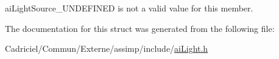 ai\-Light\-Source\-\_\-\-U\-N\-D\-E\-F\-I\-N\-E\-D is not a valid value for this member. 

The documentation for this struct was generated from the following file\-:\begin{DoxyCompactItemize}
\item 
Cadriciel/\-Commun/\-Externe/assimp/include/\hyperlink{ai_light_8h}{ai\-Light.\-h}\end{DoxyCompactItemize}
